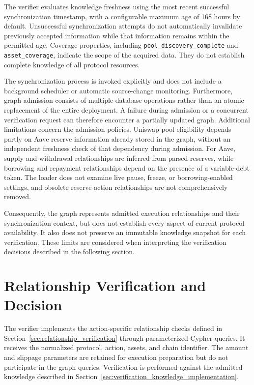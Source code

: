 The verifier evaluates knowledge freshness using the most
recent successful synchronization timestamp, with a
configurable maximum age of 168 hours by default.
Unsuccessful synchronization attempts do not automatically
invalidate previously accepted information while that
information remains within the permitted age. Coverage
properties, including \texttt{pool\_discovery\_complete}
and \texttt{asset\_coverage}, indicate the scope of the
acquired data. They do not establish complete knowledge
of all protocol resources.

The synchronization process is invoked explicitly and
does not include a background scheduler or automatic
source-change monitoring. Furthermore, graph admission
consists of multiple database operations rather than
an atomic replacement of the entire deployment. A failure
during admission or a concurrent verification request
can therefore encounter a partially updated graph. Additional limitations concern the admission policies.
Uniswap pool eligibility depends partly on Aave reserve
information already stored in the graph, without an
independent freshness check of that dependency during
admission. For Aave, supply and withdrawal relationships
are inferred from parsed reserves, while borrowing and
repayment relationships depend on the presence of a
variable-debt token. The loader does not examine live
pause, freeze, or borrowing-enabled settings, and obsolete
reserve-action relationships are not comprehensively
removed.

Consequently, the graph represents admitted execution
relationships and their synchronization context, but
does not establish every aspect of current protocol
availability. It also does not preserve an immutable
knowledge snapshot for each verification. These limits
are considered when interpreting the verification
decisions described in the following section.



\section{Relationship Verification and Decision}
\label{sec:relationship_verification_implementation}

The verifier implements the action-specific relationship checks
defined in Section~\ref{sec:relationship_verification} through
parameterized Cypher queries. It receives the normalized protocol,
action, assets, and chain identifier. The amount and slippage
parameters are retained for execution preparation but do not
participate in the graph queries. Verification is performed against
the admitted knowledge described in
Section~\ref{sec:verification_knowledge_implementation}.

